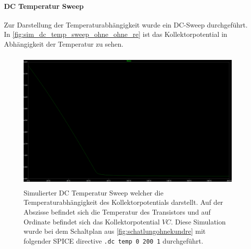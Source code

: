 \documentclass[12pt,english,ngerman]{scrartcl}
\begin{document}
\paragraph{DC Temperatur Sweep}
Zur Darstellung der Temperaturabhängigkeit wurde ein DC-Sweep durchgeführt. In \autoref{fig:sim_dc_temp_sweep_ohne_ohne_re} ist das Kollektorpotential in Abhängigkeit der Temperatur zu sehen.
\begin{figure}[H]
  \centering
    \includegraphics[width=\linewidth, height=7cm]{./figures/ohnekondundre/dcsweepkollektorpotR2auf10kohm5mv.png }
    \caption[Simulierter DC Temperatur Sweep ohne
    Überbrückungskondensator und ohne Emitterwiderstand]{Simulierter DC Temperatur Sweep welcher die
      Temperaturabhängigkeit des Kollektorpotentials darstellt. Auf der
      Abszisse befindet sich die Temperatur des Transistors und auf Ordinate
      befindet sich das Kollektorpotential $VC$. Diese Simulation wurde bei dem
      Schaltplan aus \autoref{fig:schatlungohnekundre} mit folgender SPICE
      directive \texttt{.dc temp 0 200 1} durchgeführt.
  }
  \label{fig:sim_dc_temp_sweep_ohne_ohne_re}
\end{figure}
\end{document}
